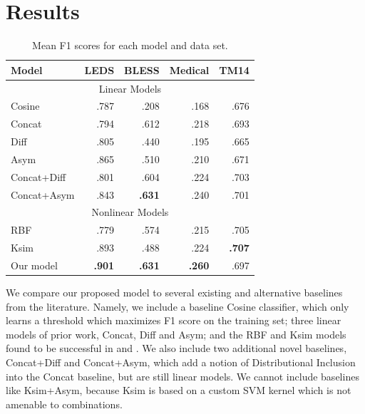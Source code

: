 \section{Results}

\begin{table}
\centering
\begin{small}
\begin{tabular}{|l|rrrr|}
  \hline
  Model            &      LEDS   &      BLESS  &      Medical  &      TM14   \\
  \hline
  \hline
  \multicolumn{5}{|c|}{Linear Models}\\
  \hline
  Cosine           &      .787   &      .208   &      .168     &      .676   \\
  Concat           &      .794   &      .612   &      .218     &      .693   \\
  Diff             &      .805   &      .440   &      .195     &      .665   \\
  Asym             &      .865   &      .510   &      .210     &      .671   \\
  Concat+Diff      &      .801   &      .604   &      .224     &      .703   \\
  Concat+Asym      &      .843   &  {\bf.631}  &      .240     &      .701   \\
  \hline
  \multicolumn{5}{|c|}{Nonlinear Models}\\
  \hline
  RBF              &      .779   &      .574   &      .215     &      .705   \\
  Ksim             &      .893   &      .488   &      .224     &  {\bf.707}  \\
  Our model        &  {\bf.901}  &  {\bf.631}  &  {\bf.260}    &      .697   \\
  \hline
\end{tabular}
\end{small}
\caption{Mean F1 scores for each model and data set.}
\label{tab:results}
\end{table}

We compare our proposed model to several existing and alternative baselines
from the literature. Namely, we include a baseline Cosine
classifier, which only learns a threshold which maximizes F1 score on the
training set; three linear models of prior work, Concat, Diff and Asym; and the
RBF and Ksim models found to be successful in
 and . We also include two additional
novel baselines, Concat+Diff and Concat+Asym, which add a notion of
Distributional Inclusion into the Concat baseline, but are still linear models.
We cannot include baselines like Ksim+Asym, because Ksim is based on a custom
SVM kernel which is not amenable to combinations.

